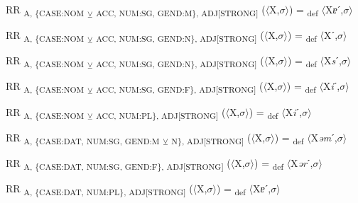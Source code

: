 {\begin{exe}
 RR \textsubscript{A, \{CASE:NOM} \textsubscript{${\veebar}$}\textsubscript{ ACC, NUM:SG, GEND:M\}, ADJ[STRONG]} ($\langle$X,$\sigma $$\rangle$) = \textsubscript{def} $\langle$X\textit{ɐ}ˊ,$\sigma $$\rangle$
\end{exe}

\begin{exe}
 RR \textsubscript{A, \{CASE:NOM} \textsubscript{${\veebar}$}\textsubscript{ ACC, NUM:SG, GEND:N\}, ADJ[STRONG]} ($\langle$X,$\sigma $$\rangle$) = \textsubscript{def} $\langle$Xˊ,$\sigma $$\rangle$
\end{exe}

\begin{exe}
 RR \textsubscript{A, \{CASE:NOM} \textsubscript{${\veebar}$}\textsubscript{ ACC, NUM:SG, GEND:N\}, ADJ[STRONG]} ($\langle$X,$\sigma $$\rangle$) = \textsubscript{def} $\langle$X\textit{s}ˊ,$\sigma $$\rangle$
\end{exe}

\begin{exe}
 RR \textsubscript{A, \{CASE:NOM} \textsubscript{${\veebar}$}\textsubscript{ ACC, NUM:SG, GEND:F\}, ADJ[STRONG]} ($\langle$X,$\sigma $$\rangle$) = \textsubscript{def} $\langle$X\textit{i}ˊ,$\sigma $$\rangle$
\end{exe}

\begin{exe}
 RR \textsubscript{A, \{CASE:NOM} \textsubscript{${\veebar}$}\textsubscript{ ACC, NUM:PL\}, ADJ[STRONG]} ($\langle$X,$\sigma $$\rangle$) = \textsubscript{def} $\langle$X\textit{i}ˊ,$\sigma $$\rangle$
\end{exe}

\begin{exe}
 RR \textsubscript{A, \{CASE:DAT, NUM:SG, GEND:M} \textsubscript{${\veebar}$}\textsubscript{ N\}, ADJ[STRONG]} ($\langle$X,$\sigma $$\rangle$) = \textsubscript{def} $\langle$X\textit{əm}ˊ,$\sigma $$\rangle$
\end{exe}

\begin{exe}
 RR \textsubscript{A, \{CASE:DAT, NUM:SG, GEND:F\}, ADJ[STRONG]} ($\langle$X,$\sigma $$\rangle$) = \textsubscript{def} $\langle$X\textit{ər}ˊ,$\sigma $$\rangle$
\end{exe}

\begin{exe}
 RR \textsubscript{A, \{CASE:DAT, NUM:PL\}, ADJ[STRONG]} ($\langle$X,$\sigma $$\rangle$) = \textsubscript{def} $\langle$X\textit{ɐ}ˊ,$\sigma $$\rangle$
\end{exe}

}
